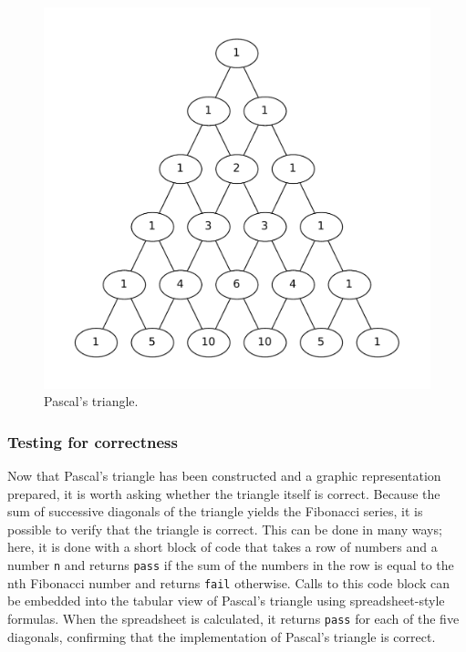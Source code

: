 \documentclass[article,shortnames]{jss}
\begin{document}
\begin{figure}[t!]
\centering
\includegraphics[width=0.6\linewidth]{pascals-triangle.pdf}
\caption{Pascal's triangle. \label{pascals-triangle-fig}}
\end{figure}
\subsubsection{Testing for correctness}
\label{sec-4-1-3}

Now that Pascal's triangle has been constructed and a graphic
representation prepared, it is worth asking whether the triangle
itself is correct.  Because the sum of successive diagonals of the
triangle yields the Fibonacci series, it is possible to verify that
the triangle is correct.  This can be done in many ways; here, it is
done with a short block of  code that takes a row of numbers
and a number \texttt{n} and returns \texttt{pass} if the sum of the numbers in the
row is equal to the nth Fibonacci number and returns \texttt{fail} otherwise.
Calls to this code block can be embedded into the tabular view of
Pascal's triangle using spreadsheet-style formulas.  When the
spreadsheet is calculated, it returns \texttt{pass} for each of the five
diagonals, confirming that the implementation of Pascal's triangle is
correct.


\end{document}
